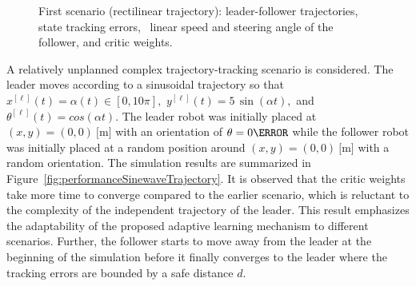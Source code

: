 \documentclass[conference]{IEEEtran}
\begin{document}
\begin{figure}[htbp]
    \caption[Leader-follower performance for rectilinear trajectory.]{First scenario (rectilinear trajectory): 
         leader-follower trajectories,~ state tracking errors,~ linear speed and steering angle of the follower, and     critic weights.}%
    \label{fig:performanceRectilinearTrajectory}%
\end{figure}
%


A relatively unplanned complex trajectory-tracking scenario is considered. The leader moves according to a sinusoidal trajectory so that %
%
$x^{[\ell]}(t) = \alpha (t) \in [0,10\pi],$ %
$y^{[\ell]}(t) = 5 \,\sin(\alpha t),$ and %
$\theta^{[\ell]}(t) = cos(\alpha t).$  %
%
The leader robot  was initially placed at $(x,y) = (0, 0)~\si{[\meter]}$ with an orientation of $\theta = 0 \degree$ while the follower robot was initially placed at a random position around $(x,y) = (0, 0)~\si{[\meter]}$ with a random orientation. The simulation results are summarized in Figure~\ref{fig:performanceSinewaveTrajectory}. It is observed that the critic weights take more time to converge compared to the earlier scenario,  which is reluctant to the complexity of the independent trajectory of the leader. This result emphasizes the adaptability of the proposed adaptive learning mechanism to different scenarios. Further, the follower starts to move away from the leader at the beginning of the simulation before it finally converges to the leader where the tracking errors are bounded by a safe distance $d.$ %
%
\end{document}
